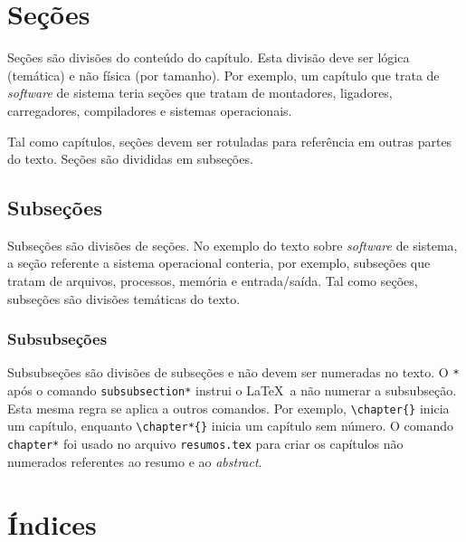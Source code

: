 \section{Seções}

Seções são divisões do conteúdo do capítulo. Esta divisão
deve ser lógica (temática) e não física (por tamanho).
Por exemplo, um capítulo que trata de \textit{software}
de sistema teria seções que tratam de montadores, ligadores,
carregadores, compiladores e sistemas operacionais.

Tal como capítulos, seções devem ser rotuladas para referência
em outras partes do texto. Seções são divididas em subseções.

\subsection{Subseções}

Subseções são divisões de seções. No exemplo do texto sobre
\textit{software} de sistema, a seção referente a sistema operacional
conteria, por exemplo, subseções que tratam de arquivos, processos,
memória e entrada/saída.  Tal como seções, subseções são divisões
temáticas do texto.

\subsubsection*{Subsubseções}

Subsubseções são divisões de subseções e não devem ser numeradas no
texto. O \texttt{*} após o comando \texttt{subsubsection*} instrui
o \LaTeX\ a não numerar a subsubseção. Esta mesma regra se aplica
a outros comandos. Por exemplo, \verb|\chapter{}|
inicia um capítulo, enquanto \verb|\chapter*{}|
inicia um capítulo sem número. O comando \texttt{chapter*} foi
usado no arquivo \texttt{resumos.tex} para criar os capítulos não
numerados referentes ao resumo e ao \textit{abstract}.

\section{Índices}

